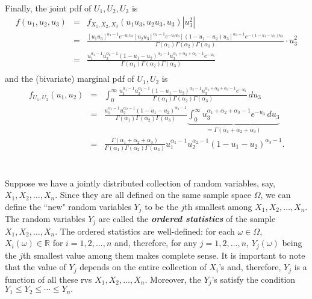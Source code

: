 \documentclass[12pt]{article}
\begin{document}
Finally, the joint pdf of $U_1,U_2,U_3$ is
\begin{eqnarray*}
f(u_1,u_2,u_3) &=& f_{X_1,X_2,X_3}(u_1u_3,u_2u_3,u_3)|u_3^2|\\
&=& \frac {[u_1u_3]^{\alpha_1-1}e^{-u_1u_3}[u_2u_3]^{\alpha_2-1}e^{-u_2u_3}[(1-u_1-u_2)u_3]^{\alpha_3-1}e^{-(1-u_1-u_2)u_3}}{\Gamma(\alpha_1)\Gamma(\alpha_2)\Gamma(\alpha_3)}\cdot u_3^2 \\
&=& \frac {u_1^{\alpha_1-1}u_2^{\alpha_2-1}(1-u_1-u_2)^{\alpha_3-1}u_3^{\alpha_1+\alpha_2+\alpha_3-1}e^{-u_3}}{\Gamma(\alpha_1)\Gamma(\alpha_2)\Gamma(\alpha_3)} \\
\end{eqnarray*}
and the (bivariate) marginal pdf of $U_1,U_2$ is
\begin{eqnarray*}
f_{U_1,U_2}(u_1,u_2) &=& \int_0^{\infty}\frac {u_1^{\alpha_1-1}u_2^{\alpha_2-1}(1-u_1-u_2)^{\alpha_3-1}u_3^{\alpha_1+\alpha_2+\alpha_3-1}e^{-u_3}}
{\Gamma(\alpha_1)\Gamma(\alpha_2)\Gamma(\alpha_3)} \,du_3\\
&=& \frac {u_1^{\alpha_1-1}u_2^{\alpha_2-1}(1-u_1-u_2)^{\alpha_3-1}}{\Gamma(\alpha_1)\Gamma(\alpha_2)\Gamma(\alpha_3)}
\underbrace{\int_0^{\infty}u_3^{\alpha_1+\alpha_2+\alpha_3-1}e^{-u_3}\,du_3}_{=\Gamma(\alpha_1+\alpha_2+\alpha_3)}\\
&=&\frac {\Gamma(\alpha_1+\alpha_2+\alpha_{3})}{\Gamma(\alpha_1)\Gamma(\alpha_2) \Gamma(\alpha_{3})}u_1^{\alpha_1-1}u_2^{\alpha_2-1}(1-u_1-u_2)^{\alpha_{3}-1}.\\
\end{eqnarray*}

\newpage


\label{orderstatistics}\\

\noindent Suppose we have a jointly distributed collection of random variables, say, $X_1,X_2,\dots,X_n$.  Since they are all defined on the same
sample space $\Omega$, we can define the ``new" random variables $Y_j$ to be the $j$th smallest among $X_1,X_2,\dots,X_n$.
The random variables $Y_j$ are called the {\bf\em ordered statistics}
of the sample $X_1,X_2,\dots, X_n$. The ordered statistics are well-defined: for each $\omega\in \Omega$, $X_i(\omega)\in {\mathbb R}$ for $i=1,2,\dots,n$ and, therefore,
for any $j=1,2,\dots,n$, $Y_j(\omega)$ being the $j$th smallest value among them makes complete sense.  It is important to note that the value of $Y_j$ depends on the entire collection of $X_i$'s and, therefore, $Y_j$ is a function of all these rvs $X_1,X_2,\dots,X_n$.  Moreover, the $Y_j$'s satisfy the condition
$Y_1\le Y_2\le \cdots \le Y_n.$\\
\end{document}
